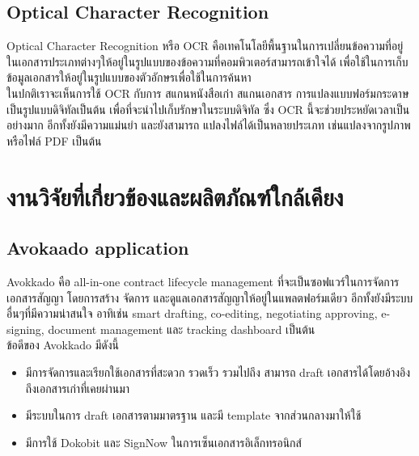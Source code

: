 \documentclass[12pt,oneside,openright,a4paper]{cpe-thai-project}
\begin{document}
\subsection{Optical Character Recognition}
\hspace*{1cm} Optical Character Recognition หรือ OCR \cite{WhatIsOCR} คือเทคโนโลยีพื้นฐานในการเปลี่ยนข้อความที่อยู่ในเอกสารประเภทต่างๆให้อยู่ในรูปแบบของข้อความที่คอมพิวเตอร์สามารถเข้าใจได้ เพื่อใช้ในการเก็บข้อมูลเอกสารให้อยู่ในรูปแบบของตัวอักษรเพื่อใช้ในการค้นหา \\
\hspace*{1cm} ในปกติเราจะเห็นการใช้ OCR กับการ สแกนหนังสือเก่า สแกนเอกสาร การแปลงแบบฟอร์มกระดาษเป็นรูปแบบดิจิทัลเป็นต้น เพื่อที่จะนำไปเก็บรักษาในระบบดิจิทัล ซึ่ง OCR นี้จะช่วยประหยัดเวลาเป็นอย่างมาก อีกทั้งยังมีความแม่นยำ และยังสามารถ แปลงไฟล์ได้เป็นหลายประเภท เช่นแปลงจากรูปภาพ หรือไฟล์ PDF เป็นต้น



\section{งานวิจัยที่เกี่ยวข้องและผลิตภัณฑ์ใกล้เคียง}
\subsection{Avokaado application}
\hspace*{1cm} Avokkado \cite{BestDMS,WhatIsAvokaado} คือ all-in-one contract lifecycle management ที่จะเป็นซอฟแวร์ในการจัดการเอกสารสัญญา โดยการสร้าง จัดการ และดูแลเอกสารสัญญาให้อยู่ในแพลตฟอร์มเดียว อีกทั้งยังมีระบบอื่นๆที่มีความน่าสนใจ อาทิเช่น smart drafting, co-editing, negotiating approving, e-signing, document management และ tracking dashboard เป็นต้น \\
\hspace*{1cm} ข้อดีของ Avokkado มีดังนี้
\begin{itemize}
  \item มีการจัดการและเรียกใช้เอกสารที่สะดวก รวดเร็ว รวมไปถึง สามารถ draft เอกสารได้โดยอ้างอิงถึงเอกสารเก่าที่เคยผ่านมา
  \item มีระบบในการ draft เอกสารตามมาตรฐาน และมี template จากส่วนกลางมาให้ใช้
  \item มีการใช้ Dokobit และ SignNow ในการเซ็นเอกสารอิเล็กทรอนิกส์
\end{itemize}
\end{document}
